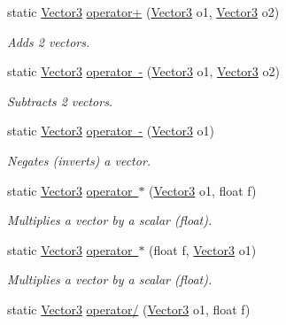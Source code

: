 \begin{DoxyCompactItemize}
static \mbox{\hyperlink{class_lua_1_1_vector3}{Vector3}} \mbox{\hyperlink{class_lua_1_1_vector3_ae40267fccb8c1e9d79d704776b07e949}{operator+}} (\mbox{\hyperlink{class_lua_1_1_vector3}{Vector3}} o1, \mbox{\hyperlink{class_lua_1_1_vector3}{Vector3}} o2)
\begin{DoxyCompactList}\small\item\em Adds 2 vectors. \end{DoxyCompactList}\item 
static \mbox{\hyperlink{class_lua_1_1_vector3}{Vector3}} \mbox{\hyperlink{class_lua_1_1_vector3_a4acda611c59fd0012d1f2c3d1d5ef1ca}{operator -\/}} (\mbox{\hyperlink{class_lua_1_1_vector3}{Vector3}} o1, \mbox{\hyperlink{class_lua_1_1_vector3}{Vector3}} o2)
\begin{DoxyCompactList}\small\item\em Subtracts 2 vectors. \end{DoxyCompactList}\item 
static \mbox{\hyperlink{class_lua_1_1_vector3}{Vector3}} \mbox{\hyperlink{class_lua_1_1_vector3_a9a7c5fab17a78a7eb42ee976ae6f3d5e}{operator -\/}} (\mbox{\hyperlink{class_lua_1_1_vector3}{Vector3}} o1)
\begin{DoxyCompactList}\small\item\em Negates (inverts) a vector. \end{DoxyCompactList}\item 
static \mbox{\hyperlink{class_lua_1_1_vector3}{Vector3}} \mbox{\hyperlink{class_lua_1_1_vector3_aa66ef31f1ffe0fd4f7f5bc2f6f55ee5f}{operator $\ast$}} (\mbox{\hyperlink{class_lua_1_1_vector3}{Vector3}} o1, float f)
\begin{DoxyCompactList}\small\item\em Multiplies a vector by a scalar (float). \end{DoxyCompactList}\item 
static \mbox{\hyperlink{class_lua_1_1_vector3}{Vector3}} \mbox{\hyperlink{class_lua_1_1_vector3_a94992e368b015b3446d372df71c93d30}{operator $\ast$}} (float f, \mbox{\hyperlink{class_lua_1_1_vector3}{Vector3}} o1)
\begin{DoxyCompactList}\small\item\em Multiplies a vector by a scalar (float). \end{DoxyCompactList}\item 
static \mbox{\hyperlink{class_lua_1_1_vector3}{Vector3}} \mbox{\hyperlink{class_lua_1_1_vector3_a2e065e07d84200e5a9cec3270ef1d30f}{operator/}} (\mbox{\hyperlink{class_lua_1_1_vector3}{Vector3}} o1, float f)

\end{DoxyCompactItemize}
